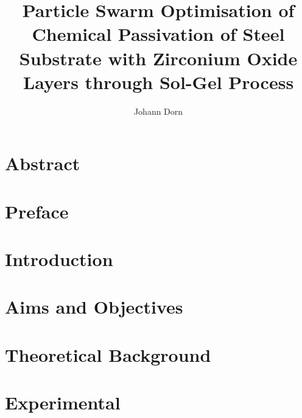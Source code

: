 \documentclass[a4paper]{article}
\title{Particle Swarm Optimisation of Chemical Passivation of Steel Substrate with Zirconium Oxide Layers through Sol-Gel Process}
\author{Johann Dorn}
\begin{document}
\maketitle


\clearpage
\section*{Abstract}


\section*{Preface}
%

\tableofcontents
\clearpage
\printglossaries
\clearpage

\section{Introduction}                                
\label{sec:intro}
%

\section{Aims and Objectives}
\label{sec:aims}
%

\section{Theoretical Background}
\label{sec:theoretical}
%

\section{Experimental}
\label{sec:exp}
%
\end{document}
